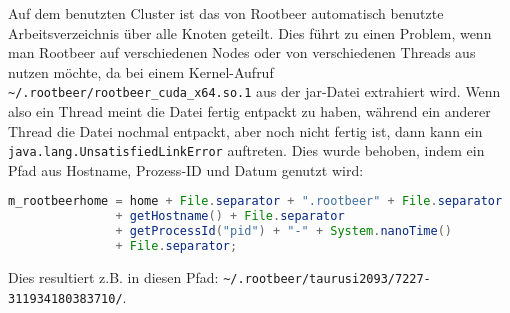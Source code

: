 Auf dem benutzten Cluster ist das von Rootbeer automatisch benutzte Arbeitsverzeichnis über alle Knoten geteilt. Dies führt zu einen Problem, wenn man Rootbeer auf verschiedenen Nodes oder von verschiedenen Threads aus nutzen möchte, da bei einem Kernel-Aufruf \lstinline!~/.rootbeer/rootbeer_cuda_x64.so.1! aus der jar-Datei extrahiert wird. Wenn also ein Thread meint die Datei fertig entpackt zu haben, während ein anderer Thread die Datei nochmal entpackt, aber noch nicht fertig ist, dann kann ein \texttt{java.lang.UnsatisfiedLinkError} auftreten. Dies wurde behoben, indem ein Pfad aus Hostname, Prozess-ID und Datum genutzt wird:
\begin{lstlisting}[language=Java]
m_rootbeerhome = home + File.separator + ".rootbeer" + File.separator
               + getHostname() + File.separator
               + getProcessId("pid") + "-" + System.nanoTime()
               + File.separator;
\end{lstlisting}\vspace{-1.5\baselineskip}
Dies resultiert z.B. in diesen Pfad: \lstinline!~/.rootbeer/taurusi2093/7227-311934180383710/!.


